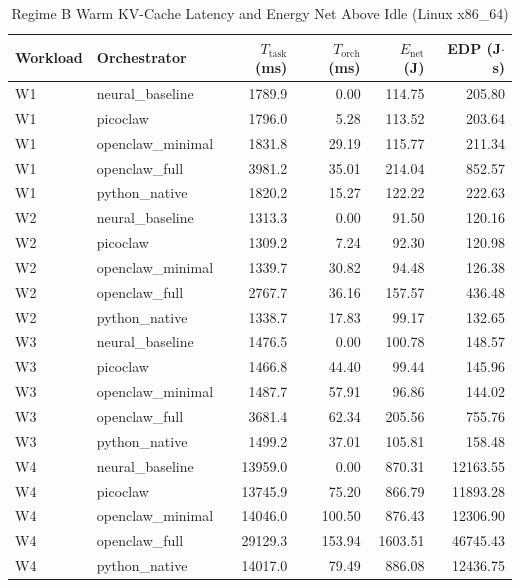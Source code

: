 \begin{table}[t]
\centering\small
\caption{Regime B Warm KV-Cache Latency and Energy Net Above Idle (Linux x86_64)}
\label{tab:linux_warm_cache}
\begin{tabular}{llrrrr}
\toprule
Workload & Orchestrator & $T_{\text{task}}$ (ms) & $T_{\text{orch}}$ (ms) & $E_{\text{net}}$ (J) & EDP (J$\cdot$s) \\
\midrule
W1 & neural\_baseline & 1789.9 & 0.00 & 114.75 & 205.80 \\
W1 & picoclaw & 1796.0 & 5.28 & 113.52 & 203.64 \\
W1 & openclaw\_minimal & 1831.8 & 29.19 & 115.77 & 211.34 \\
W1 & openclaw\_full & 3981.2 & 35.01 & 214.04 & 852.57 \\
W1 & python\_native & 1820.2 & 15.27 & 122.22 & 222.63 \\
W2 & neural\_baseline & 1313.3 & 0.00 & 91.50 & 120.16 \\
W2 & picoclaw & 1309.2 & 7.24 & 92.30 & 120.98 \\
W2 & openclaw\_minimal & 1339.7 & 30.82 & 94.48 & 126.38 \\
W2 & openclaw\_full & 2767.7 & 36.16 & 157.57 & 436.48 \\
W2 & python\_native & 1338.7 & 17.83 & 99.17 & 132.65 \\
W3 & neural\_baseline & 1476.5 & 0.00 & 100.78 & 148.57 \\
W3 & picoclaw & 1466.8 & 44.40 & 99.44 & 145.96 \\
W3 & openclaw\_minimal & 1487.7 & 57.91 & 96.86 & 144.02 \\
W3 & openclaw\_full & 3681.4 & 62.34 & 205.56 & 755.76 \\
W3 & python\_native & 1499.2 & 37.01 & 105.81 & 158.48 \\
W4 & neural\_baseline & 13959.0 & 0.00 & 870.31 & 12163.55 \\
W4 & picoclaw & 13745.9 & 75.20 & 866.79 & 11893.28 \\
W4 & openclaw\_minimal & 14046.0 & 100.50 & 876.43 & 12306.90 \\
W4 & openclaw\_full & 29129.3 & 153.94 & 1603.51 & 46745.43 \\
W4 & python\_native & 14017.0 & 79.49 & 886.08 & 12436.75 \\
\bottomrule
\end{tabular}
\end{table}
